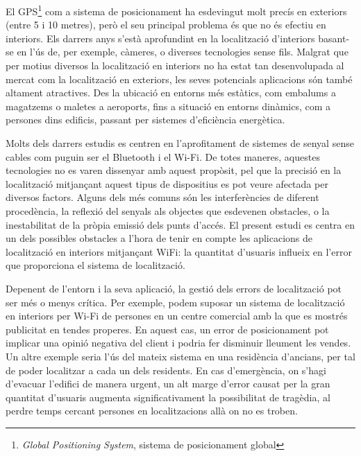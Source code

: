 
El GPS\footnote{\textit{Global Positioning System}, sistema de posicionament global} com a sistema de posicionament ha esdevingut molt precís en exteriors (entre 5 i 10 metres\cite{pogge}), però el seu principal problema és que no és efectiu en interiors. Els darrers anys s’està aprofundint en la localització d’interiors basant-se en l’ús de, per exemple, càmeres, o diverses tecnologies sense fils. Malgrat que per motius diversos la localització en interiors no ha estat tan desenvolupada al mercat com la localització en exteriors, les seves potencials aplicacions són també altament atractives. Des la ubicació en entorns més estàtics, com embalums a magatzems o maletes a aeroports, fins a situació en entorns dinàmics, com a persones dins edificis, passant per sistemes d'eficiència energètica.

Molts dels darrers estudis es centren en l’aprofitament de sistemes de senyal sense cables com puguin ser el Bluetooth\cite{kotanen} i el Wi-Fi\cite{bagosi}\cite{evennou}\cite{garcia}. De totes maneres, aquestes tecnologies no es varen dissenyar amb aquest propòsit, pel que la precisió en la localització mitjançant aquest tipus de dispositius es pot veure afectada per diversos factors. Alguns dels més comuns són les interferències de diferent procedència, la reflexió del senyals als objectes que esdevenen obstacles, o la inestabilitat de la pròpia emissió dels punts d'accés. El present estudi es centra en un dels possibles obstacles a l'hora de tenir en compte les aplicacions de localització en interiors mitjançant WiFi: la quantitat d'usuaris influeix en l’error que proporciona el sistema de localització.

Depenent de l’entorn i la seva aplicació, la gestió dels errors de localització pot ser més o menys crítica. Per exemple, podem suposar un sistema de localització en interiors per Wi-Fi de persones en un centre comercial amb la que es mostrés publicitat en tendes properes. En aquest cas, un error de posicionament pot implicar una opinió negativa del client i podria fer disminuir lleument les vendes. Un altre exemple seria l’ús del mateix sistema en una residència d’ancians, per tal de poder localitzar a cada un dels residents. En cas d’emergència, on s’hagi d’evacuar l’edifici de manera urgent, un alt marge d’error causat per la gran quantitat d'usuaris augmenta significativament la possibilitat de tragèdia, al perdre temps cercant persones en localitzacions allà on no es troben.

